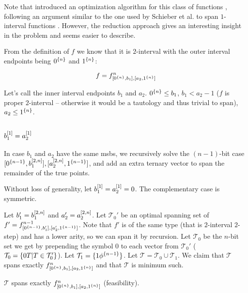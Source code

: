 Note that
\dubovsky{} introduced an optimization algorithm for
this class of functions \cite[section 3.2]{Dubovsky2012},
following an argument similar to the one used by
Schieber et al. to span $1$-interval functions
\cite{Schieber2005154}.
However,
the reduction approach gives
an interesting insight in the problem
and seems easier to describe.

From the definition of $f$ we know that it is $2$-interval
with the outer interval endpoints being
$0^{\{n\}}$ and $1^{\{n\}}$:

\[
f = f^{n}_{[0^{\{n\}}, b_1], [a_2, 1^{\{n\}}]}
\]

Let's call the inner interval endpoints $b_1$ and $a_2$.
$0^{\{n\}} \leq b_1$,
$b_1 < a_2 - 1$ ($f$ is proper $2$-interval
-- otherwise it would be a tautology
and thus trivial to span),
$a_2 \leq 1^{\{n\}}$.

\subsection{\texorpdfstring{$b_1^{[1]} = a_2^{[1]}$}
{b1[1] = a2[1]}
}

In case $b_1$ and $a_2$ have the same \acrshort{msb}s,
we recursively solve the $(n-1)$-bit
case
$[0^{\{n-1\}}, b_1^{[2, n]}],
[a_2^{[2, n]}, 1^{\{n-1\}}]$,
and add an extra ternary vector to span the remainder
of the true points.

Without loss of generality,
let $b_1^{[1]} = a_2^{[1]} = 0$.
The complementary case is symmetric.

Let $b_1' = b_1^{[2, n]}$
and $a_2' = a_2^{[2, n]}$.
Let $\mathcal{T}_0'$ be an optimal spanning set of
$f' = f^{n-1}_{[0^{\{n-1\}}, b_1'], [a_2', 1^{\{n-1\}}]}$.
Note that $f'$ is of the same type
(that is $2$-interval $2$-step)
and has a lower arity,
so we can span it by recursion.
Let $\mathcal{T}_0$ be the $n$-bit set we get
by prepending the symbol $0$
to each vector from $\mathcal{T}_0'$
($\mathcal{T}_0 = \{0 T | T \in \mathcal{T}_0'\}$).
Let $\mathcal{T}_1 = \{1 \phi^{\{n-1\}}\}$.
Let $\mathcal{T} = \mathcal{T}_0 \cup \mathcal{T}_1$.
We claim that $\mathcal{T}$ spans exactly
$f^{n}_{[0^{\{n\}}, b_1], [a_2, 1^{\{n\}}]}$
and that $\mathcal{T}$ is minimum such.

\begin{theorem}
$\mathcal{T}$ spans exactly
$f^{n}_{[0^{\{n\}}, b_1], [a_2, 1^{\{n\}}]}$ (feasibility).
\end{theorem}

